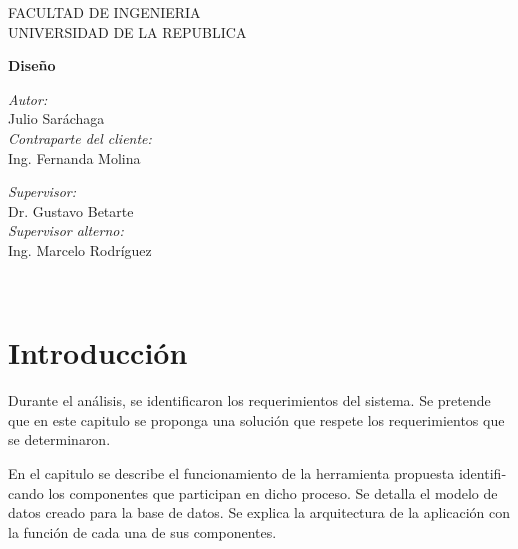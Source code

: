 \documentclass[11pt]{article}
\title{}
\begin{document}
  
   \begin{titlepage}

\begin{center}
\vspace*{-1in}

FACULTAD DE INGENIERIA\\
\vspace*{0.15in}
UNIVERSIDAD DE LA REPUBLICA \\
\vspace*{0.6in}
\vspace*{0.2in}
\begin{Large}
\textbf{Diseño} \\
\end{Large}
\vspace*{0.3in}
\end{center}

\begin{minipage}{0.4\textwidth}
\begin{flushleft} \large
\emph{Autor:}\\
Julio Saráchaga\\
\bigskip
\emph{Contraparte del cliente:}\\
Ing. Fernanda Molina
\end{flushleft}
\end{minipage}
\begin{minipage}{0.4\textwidth}
\begin{flushright} \large
\emph{Supervisor:} \\
Dr. Gustavo Betarte\\
\bigskip
\emph{Supervisor alterno:} \\
Ing. Marcelo Rodríguez
\end{flushright}
\end{minipage}\\[3cm]

\end{titlepage}

\clearpage\setcounter{page}{1}\section[Introducción]{Introducción}
\foreignlanguage{spanish}{Durante el análisis, se identificaron los requerimientos del sistema. Se pretende que en este
capitulo se proponga una solución que respete los requerimientos que se determinaron.}

\foreignlanguage{spanish}{En el capitulo se describe el funcionamiento de la herramienta propuesta identificando los
componentes que participan en dicho proceso. Se detalla el modelo de datos creado para la base de datos. Se explica la
arquitectura de la aplicación con la función de cada una de sus componentes.}
\end{document}
